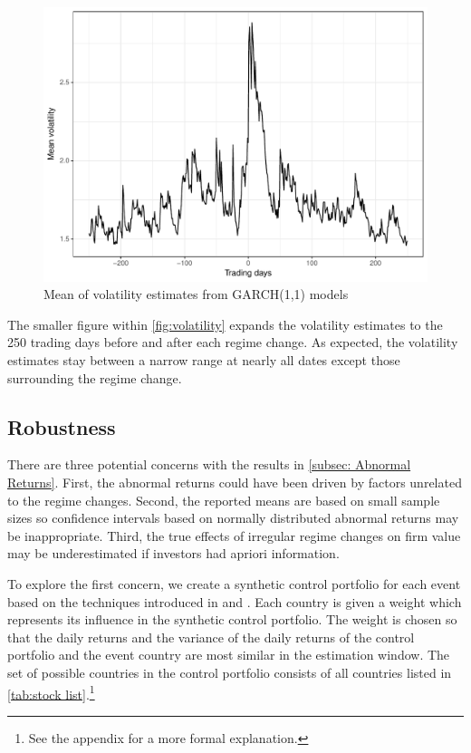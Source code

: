 \documentclass[12pt,final,fleqn]{article}
\theoremstyle{plain}
\begin{document}
\begin{figure}[htb]
\includegraphics{../figs/mean-volatility.pdf}
\caption{Mean of volatility estimates from GARCH(1,1) models}
\label{fig:volatility}
\end{figure}

The smaller figure within \autoref{fig:volatility} expands the volatility estimates to the 250 trading days before and after each regime change. As expected, the volatility estimates stay between a narrow range at nearly all dates except those surrounding the regime change.

\subsection{Robustness} \label{subsec: Robustness}
There are three potential concerns with the results in \autoref{subsec: Abnormal Returns}. First, the abnormal returns could have been driven by factors unrelated to the regime changes. Second, the reported means are based on small sample sizes so confidence intervals based on normally distributed abnormal returns may be inappropriate. Third, the true effects of irregular regime changes on firm value may be underestimated if investors had apriori information.

To explore the first concern, we create a synthetic control portfolio for each event based on the techniques introduced in \citep{abadie2003economic} and \citep{abadie2010synthetic}. Each country is given a weight which represents its influence in the synthetic control portfolio. The weight is chosen so that the daily returns and the variance of the daily returns of the control portfolio and the event country are most similar in the estimation window. The set of possible countries in the control portfolio consists of all countries listed in \autoref{tab:stock list}.\footnote{See the appendix for a more formal explanation.}
\end{document}
